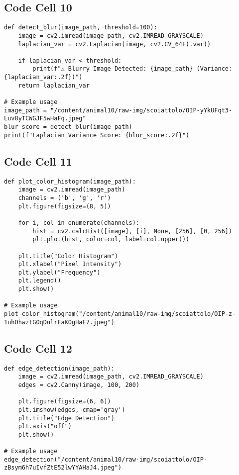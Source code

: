 \documentclass{article}
\begin{document}
\subsection*{Code Cell 10}
\begin{lstlisting}
def detect_blur(image_path, threshold=100):
    image = cv2.imread(image_path, cv2.IMREAD_GRAYSCALE)
    laplacian_var = cv2.Laplacian(image, cv2.CV_64F).var()

    if laplacian_var < threshold:
        print(f"⚠ Blurry Image Detected: {image_path} (Variance: {laplacian_var:.2f})")
    return laplacian_var

# Example usage
image_path = "/content/animal10/raw-img/scoiattolo/OIP-yYkUFqt3-Luv8yTCWGJF5wHaFq.jpeg"
blur_score = detect_blur(image_path)
print(f"Laplacian Variance Score: {blur_score:.2f}")
\end{lstlisting}

\subsection*{Code Cell 11}
\begin{lstlisting}
def plot_color_histogram(image_path):
    image = cv2.imread(image_path)
    channels = ('b', 'g', 'r')
    plt.figure(figsize=(8, 5))

    for i, col in enumerate(channels):
        hist = cv2.calcHist([image], [i], None, [256], [0, 256])
        plt.plot(hist, color=col, label=col.upper())

    plt.title("Color Histogram")
    plt.xlabel("Pixel Intensity")
    plt.ylabel("Frequency")
    plt.legend()
    plt.show()

# Example usage
plot_color_histogram("/content/animal10/raw-img/scoiattolo/OIP-z-1uhOhwztGOqDulrEaKOgHaE7.jpeg")
\end{lstlisting}

\subsection*{Code Cell 12}
\begin{lstlisting}
def edge_detection(image_path):
    image = cv2.imread(image_path, cv2.IMREAD_GRAYSCALE)
    edges = cv2.Canny(image, 100, 200)

    plt.figure(figsize=(6, 6))
    plt.imshow(edges, cmap='gray')
    plt.title("Edge Detection")
    plt.axis("off")
    plt.show()

# Example usage
edge_detection("/content/animal10/raw-img/scoiattolo/OIP-zBsym6h7uIvfZtE52lwYYAHaJ4.jpeg")
\end{lstlisting}
\end{document}
